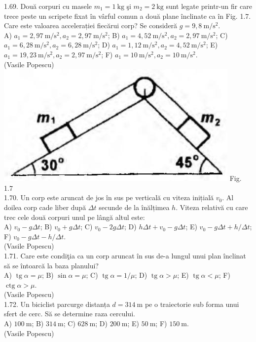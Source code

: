 1.69. Două corpuri cu masele $m_{1}=1 \mathrm{~kg}$ şi $m_{2}=2 \mathrm{~kg}$ sunt legate printr-un fir care trece peste un scripete fixat în vârful comun a două plane înclinate ca în Fig. 1.7. Care este valoarea accelerației fiecărui corp? Se consideră $g=9,8 \mathrm{~m} / \mathrm{s}^{2}$.\\ A) $a_{1}=2,97 \mathrm{~m} / \mathrm{s}^{2}, a_{2}=2,97 \mathrm{~m} / \mathrm{s}^{2}$; B) $a_{1}=4,52 \mathrm{~m} / \mathrm{s}^{2}, a_{2}=2,97 \mathrm{~m} / \mathrm{s}^{2}$; C) $a_{1}=6,28 \mathrm{~m} / \mathrm{s}^{2}, a_{2}=6,28 \mathrm{~m} / \mathrm{s}^{2}$; D) $a_{1}=1,12 \mathrm{~m} / \mathrm{s}^{2}, a_{2}=4,52 \mathrm{~m} / \mathrm{s}^{2}$; E) $a_{1}=19,23 \mathrm{~m} / \mathrm{s}^{2}, a_{2}=2,97 \mathrm{~m} / \mathrm{s}^{2}$; F) $a_{1}=10 \mathrm{~m} / \mathrm{s}^{2}, a_{2}=10 \mathrm{~m} / \mathrm{s}^{2}$.\\ (Vasile Popescu)\\ \includegraphics[width=0.4\linewidth]{images/2025_07_01_5b3ff9fa0d508c8e9f17g-018} Fig. 1.7\\

1.70. Un corp este aruncat de jos în sus pe verticală cu viteza inițială $v_{0}$. Al doilea corp cade liber după $\Delta t$ secunde de la înălțimea $h$. Viteza relativă cu care trec cele două corpuri unul pe lângă altul este:\\ A) $v_{0}-g \Delta t$; B) $v_{0}+g \Delta t$; C) $v_{0}-2 g \Delta t$; D) $h \Delta t+v_{0}-g \Delta t$; E) $v_{0}-g \Delta t+h / \Delta t$; F) $v_{0}-g \Delta t-h / \Delta t$.\\ (Vasile Popescu)\\

1.71. Care este condiţia ca un corp aruncat în sus de-a lungul unui plan înclinat să se întoarcă la baza planului?\\ A) $\operatorname{tg} \alpha=\mu$; B) $\sin \alpha=\mu$; C) $\operatorname{tg} \alpha=1 / \mu$; D) $\operatorname{tg} \alpha>\mu$; E) $\operatorname{tg} \alpha<\mu$; F) $\operatorname{ctg} \alpha>\mu$.\\ (Vasile Popescu)\\

1.72. Un biciclist parcurge distanța $d=314 \mathrm{~m}$ pe o traiectorie sub forma unui sfert de cerc. Să se determine raza cercului.\\ A) $100 \mathrm{~m}$; B) $314 \mathrm{~m}$; C) $628 \mathrm{~m}$; D) $200 \mathrm{~m}$; E) $50 \mathrm{~m}$; F) $150 \mathrm{~m}$.\\ (Vasile Popescu)\\

